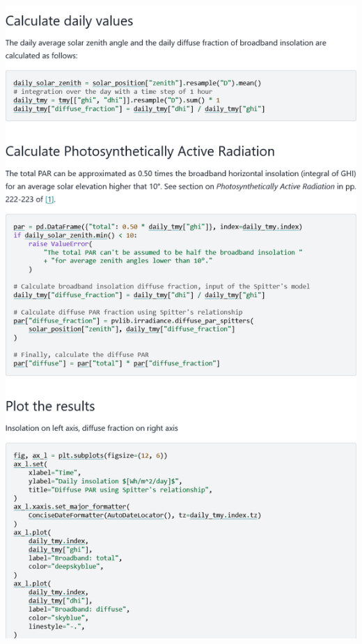 \begin{myparindent}{0pt}
\includegraphics[width=\linewidth,height=0.9\textheight,keepaspectratio]{images/docs_examples_cut/spitters_1.png}


\end{myparindent}
